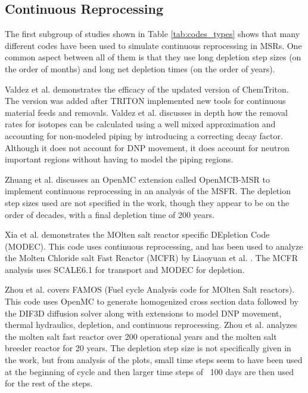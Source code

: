 \subsection{Continuous Reprocessing}
\label{litrev-msr-continuous}

The first subgroup of studies shown in Table \ref{tab:codes_types} shows that many different codes have been used to simulate continuous reprocessing in MSRs. One common aspect between all of them is that they use long depletion step sizes (on the order of months) and long net depletion times (on the order of years).

Valdez et al. \cite{jr_vicente_valdez_modeling_2020} demonstrates the efficacy of the updated version of ChemTriton. The version was added after TRITON implemented new tools for continuous material feeds and removals. Valdez et al. discusses in depth how the removal rates for isotopes can be calculated using a well mixed approximation and accounting for non-modeled piping by introducing a correcting decay factor. Although it does not account for DNP movement, it does account for neutron important regions without having to model the piping regions.

Zhuang et al. \cite{zhuang_extended_2020} discusses an OpenMC extension called OpenMCB-MSR to implement continuous reprocessing in an analysis of the MSFR. The depletion step sizes used are not specified in the work, though they appear to be on the order of decades, with a final depletion time of 200 years.

Xia et al. \cite{xia_development_2019} demonstrates the MOlten salt reactor specific DEpletion Code (MODEC). This code uses continuous reprocessing, and has been used to analyze the Molten Chloride salt Fast Reactor (MCFR) by Liaoyuan et al. \cite{liaoyuan_th-u_2021}. The MCFR analysis uses SCALE6.1 for transport and MODEC for depletion. 

Zhou et al. \cite{zhou_fuel_2018} covers FAMOS (Fuel cycle Analysis code for MOlten Salt reactors). This code uses OpenMC to generate homogenized cross section data followed by the DIF3D diffusion solver along with extensions to model DNP movement, thermal hydraulics, depletion, and continuous reprocessing. Zhou et al. analyzes the molten salt fast reactor over 200 operational years and the molten salt breeder reactor for 20 years. The depletion step size is not specifically given in the work, but from analysis of the plots, small time steps seem to have been used at the beginning of cycle and then larger time steps of ~100 days are then used for the rest of the steps.

